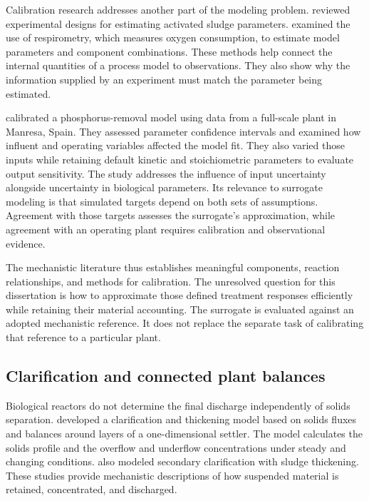Calibration research addresses another part of the modeling problem. \citet{Petersen2003} reviewed experimental designs for estimating activated sludge parameters. \citet{Vanrolleghem1999} examined the use of respirometry, which measures oxygen consumption, to estimate model parameters and component combinations. These methods help connect the internal quantities of a process model to observations. They also show why the information supplied by an experiment must match the parameter being estimated.

\citet{Machado2014} calibrated a phosphorus-removal model using data from a full-scale plant in Manresa, Spain. They assessed parameter confidence intervals and examined how influent and operating variables affected the model fit. They also varied those inputs while retaining default kinetic and stoichiometric parameters to evaluate output sensitivity. The study addresses the influence of input uncertainty alongside uncertainty in biological parameters. Its relevance to surrogate modeling is that simulated targets depend on both sets of assumptions. Agreement with those targets assesses the surrogate's approximation, while agreement with an operating plant requires calibration and observational evidence.

The mechanistic literature thus establishes meaningful components, reaction relationships, and methods for calibration. The unresolved question for this dissertation is how to approximate those defined treatment responses efficiently while retaining their material accounting. The surrogate is evaluated against an adopted mechanistic reference. It does not replace the separate task of calibrating that reference to a particular plant.

\subsection{Clarification and connected plant balances}

Biological reactors do not determine the final discharge independently of solids separation. \citet{Takacs1991} developed a clarification and thickening model based on solids fluxes and balances around layers of a one-dimensional settler. The model calculates the solids profile and the overflow and underflow concentrations under steady and changing conditions. \citet{HartelPopel1992} also modeled secondary clarification with sludge thickening. These studies provide mechanistic descriptions of how suspended material is retained, concentrated, and discharged.

